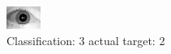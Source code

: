 \begin{figure}[h!]
\begin{center}
\includegraphics[width=0.60\columnwidth]{figures/ID1673_class_3_target_2.png}
\end{center}
\caption{ Classification: 3 actual target: 2}
\label{fig:ID1673_class_3_target_2}
\end{figure}
